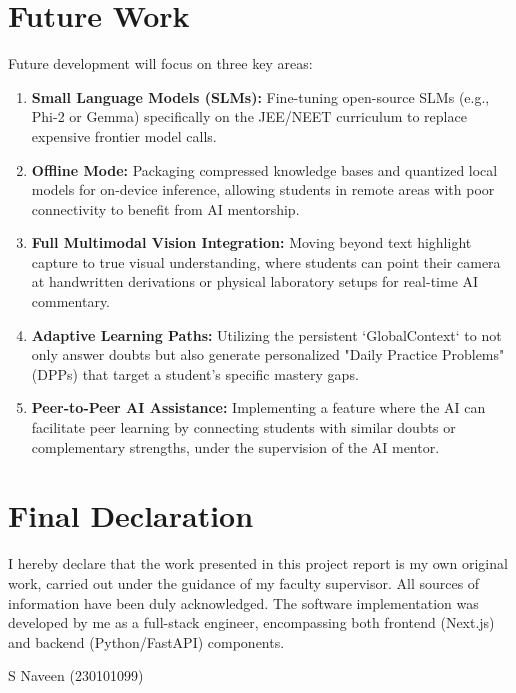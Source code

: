\section{Future Work}

Future development will focus on three key areas:
\begin{enumerate}
\item \textbf{Small Language Models (SLMs):} Fine-tuning open-source SLMs (e.g., Phi-2 or Gemma) specifically on the JEE/NEET curriculum to replace expensive frontier model calls.
    \item \textbf{Offline Mode:} Packaging compressed knowledge bases and quantized local models for on-device inference, allowing students in remote areas with poor connectivity to benefit from AI mentorship.
    \item \textbf{Full Multimodal Vision Integration:} Moving beyond text highlight capture to true visual understanding, where students can point their camera at handwritten derivations or physical laboratory setups for real-time AI commentary.
    \item \textbf{Adaptive Learning Paths:} Utilizing the persistent `GlobalContext` to not only answer doubts but also generate personalized "Daily Practice Problems" (DPPs) that target a student's specific mastery gaps.
    \item \textbf{Peer-to-Peer AI Assistance:} Implementing a feature where the AI can facilitate peer learning by connecting students with similar doubts or complementary strengths, under the supervision of the AI mentor.
\end{enumerate}


\section{Final Declaration}

I hereby declare that the work presented in this project report is my own original work, carried out under the guidance of my faculty supervisor. All sources of information have been duly acknowledged. The software implementation was developed by me as a full-stack engineer, encompassing both frontend (Next.js) and backend (Python/FastAPI) components.

\vspace{1cm}\hspace{8cm} S Naveen (230101099)
